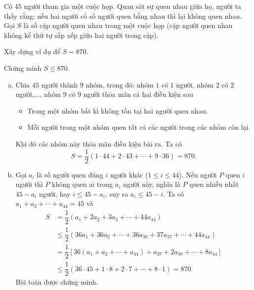 \begin{ex}%
Có $45$ người tham gia một cuộc họp. Quan sát sự quen nhau giữa họ, người ta thấy rằng: nếu hai người có số người quen bằng nhau thì lại không quen nhau. Gọi $S$ là số cặp người quen nhau trong một cuộc họp (cặp người quen nhau không kể thứ tự sắp xếp giữa hai người trong cặp).
    \begin{listEX}
        \item Xây dựng ví dụ để $S=870$.
        \item Chứng minh $S\le 870$.
    \end{listEX}
\loigiai
    {
\begin{enumerate}[a)]

        \item Chia $45$ người thành $9$ nhóm, trong đó: nhóm $1$ có $1$ người, nhóm $2$ có $2$ người,..., nhóm $9$ có $9$ người thỏa mãn cả hai điều kiện sau
				\begin{itemize}
				\item Trong một nhóm bất kì không tồn tại hai người quen nhau.
				\item Mỗi người trong một nhóm quen tất cả các người trong các nhóm còn lại.
				\end{itemize}
		Khi đó các nhóm này thỏa mãn điều kiện bài ra. Ta có $$S=\dfrac{1}{2}\left(1\cdot 44+2\cdot 43+\cdots+9\cdot 36\right)=870.$$
        \item Gọi $a_i$ là số người quen đúng $i$ người khác ($1\le i\le 44$). Nếu người $P$ quen $i$ người thì $P$ không quen ai trong $a_i$ người này, nghĩa là $P$ quen nhiều nhất $45-a_i$ người, hay $i\le 45-a_i$, suy ra $a_i\le 45-i$. Ta có $a_1+a_2+\cdots+a_{44}=45$ và {\allowdisplaybreaks\begin{align*}
S&=\dfrac{1}{2}(a_1+2a_2+3a_3+\cdots+44a_{44})\\ 
&\le \dfrac{1}{2}\left(36a_1+36a_2+\cdots+36a_{36}+37a_{37}+\cdots+44a_{44}\right)\\
&=\dfrac{1}{2}\left[36\left(a_1+a_2+\cdots+a_{44}\right)+a_{37}+2a_{38}+\cdots+8a_{44}\right]\\
&\le \dfrac{1}{2}\left(36\cdot 45+1\cdot 8+2\cdot 7+\cdots+8\cdot 1\right)=870.
\end{align*}}
Bài toán được chứng minh.
\end{enumerate}
    }
\end{ex}
